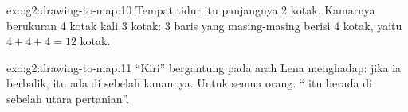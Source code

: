 \begin{solution}{exo:g2:drawing-to-map:10}
Tempat tidur itu panjangnya 2 kotak. Kamarnya berukuran 4 kotak kali 3
kotak: 3 baris yang masing-masing berisi 4 kotak, yaitu $4 + 4 + 4 = 12$ kotak.
\end{solution}

\begin{solution}{exo:g2:drawing-to-map:11}
``Kiri'' bergantung pada arah Lena menghadap: jika ia berbalik,  itu
ada di sebelah kanannya. Untuk semua orang: `` itu berada di sebelah
utara pertanian''.
\end{solution}
